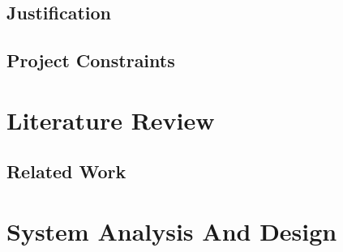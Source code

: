 \documentclass{report}
\begin{document}
\section{Justification}




\section{Project Constraints}



\chapter{Literature Review}

\section{Related Work}


\chapter{System Analysis And Design}






\nocite{businessInsider}
\nocite{carpoolworld}


\end{document}
